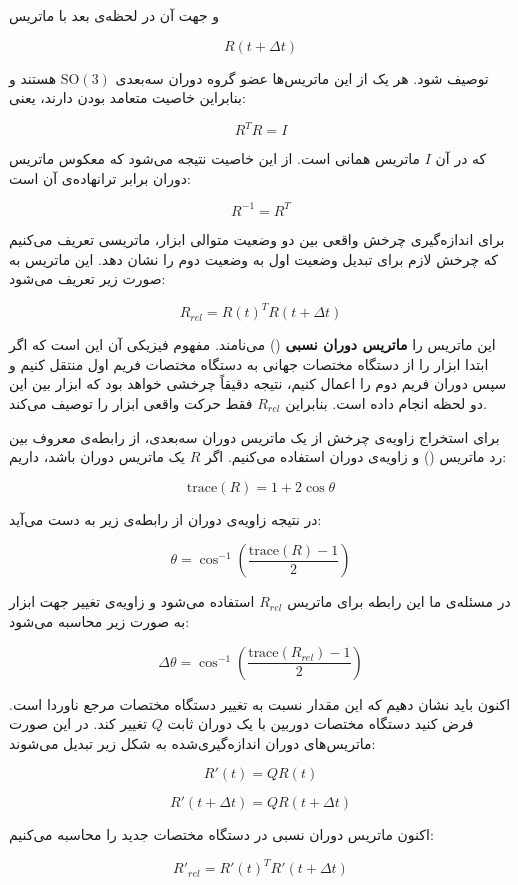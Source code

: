 \documentclass{article}
\begin{document}
و جهت آن در لحظه‌ی بعد با ماتریس

\[
R(t+\Delta t)
\]

توصیف شود. هر یک از این ماتریس‌ها عضو گروه دوران سه‌بعدی \(\text{SO}(3)\) هستند و بنابراین خاصیت متعامد بودن دارند، یعنی:

\[
R^T R = I
\]

که در آن \(I\) ماتریس همانی است. از این خاصیت نتیجه می‌شود که معکوس ماتریس دوران برابر ترانهاده‌ی آن است:

\[
R^{-1} = R^T
\]

برای اندازه‌گیری چرخش واقعی بین دو وضعیت متوالی ابزار، ماتریسی تعریف می‌کنیم که چرخش لازم برای تبدیل وضعیت اول به وضعیت دوم را نشان دهد. این ماتریس به صورت زیر تعریف می‌شود:

\[
R_{rel} = R(t)^T R(t+\Delta t)
\]

این ماتریس را \textbf{ماتریس دوران نسبی} () می‌نامند. مفهوم فیزیکی آن این است که اگر ابتدا ابزار را از دستگاه مختصات جهانی به دستگاه مختصات فریم اول منتقل کنیم و سپس دوران فریم دوم را اعمال کنیم، نتیجه دقیقاً چرخشی خواهد بود که ابزار بین این دو لحظه انجام داده است. بنابراین \(R_{rel}\) فقط حرکت واقعی ابزار را توصیف می‌کند.

برای استخراج زاویه‌ی چرخش از یک ماتریس دوران سه‌بعدی، از رابطه‌ی معروف بین رد ماتریس () و زاویه‌ی دوران استفاده می‌کنیم. اگر \(R\) یک ماتریس دوران باشد، داریم:

\[
\text{trace}(R) = 1 + 2\cos\theta
\]

در نتیجه زاویه‌ی دوران از رابطه‌ی زیر به دست می‌آید:

\[
\theta =
\cos^{-1}
\left(
\frac{\text{trace}(R)-1}{2}
\right)
\]

در مسئله‌ی ما این رابطه برای ماتریس \(R_{rel}\) استفاده می‌شود و زاویه‌ی تغییر جهت ابزار به صورت زیر محاسبه می‌شود:

\[
\Delta \theta =
\cos^{-1}
\left(
\frac{\text{trace}(R_{rel})-1}{2}
\right)
\]

اکنون باید نشان دهیم که این مقدار نسبت به تغییر دستگاه مختصات مرجع ناوردا است. فرض کنید دستگاه مختصات دوربین با یک دوران ثابت \(Q\) تغییر کند. در این صورت ماتریس‌های دوران اندازه‌گیری‌شده به شکل زیر تبدیل می‌شوند:

\[
R'(t) = Q R(t)
\]

\[
R'(t+\Delta t) = Q R(t+\Delta t)
\]

اکنون ماتریس دوران نسبی در دستگاه مختصات جدید را محاسبه می‌کنیم:

\[
R'_{rel} = R'(t)^T R'(t+\Delta t)
\]
\end{document}
